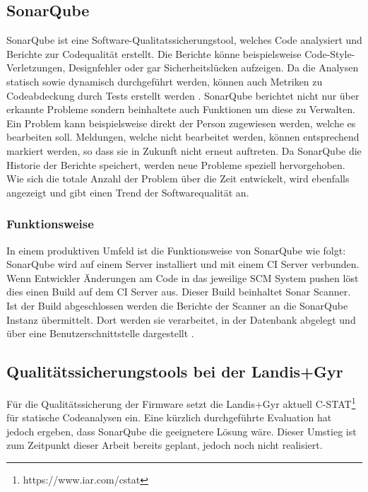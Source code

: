 \subsection{SonarQube}\label{quality:sonar}
SonarQube ist eine Software-Qualitatssicherungstool, welches Code analysiert und Berichte zur Codequalität erstellt.
Die Berichte könne beispielsweise Code-Style-Verletzungen, Designfehler oder gar Sicherheitslücken aufzeigen.
Da die Analysen statisch sowie dynamisch durchgeführt werden, können auch Metriken zu Codeabdeckung durch Tests erstellt werden \parencite{malloy_2021}.
SonarQube berichtet nicht nur über erkannte Probleme sondern beinhaltete auch Funktionen um diese zu Verwalten.
Ein Problem kann beispielsweise direkt der Person zugewiesen werden, welche es bearbeiten soll.
Meldungen, welche nicht bearbeitet werden, können entsprechend markiert werden, so dass sie in Zukunft nicht erneut auftreten.
Da SonarQube die Historie der Berichte speichert, werden neue Probleme speziell hervorgehoben.
Wie sich die totale Anzahl der Problem über die Zeit entwickelt, wird ebenfalls angezeigt und gibt einen Trend der Softwarequalität an.


\subsubsection{Funktionsweise}\label{sonar:funktionsweise}
In einem produktiven Umfeld ist die Funktionsweise von SonarQube wie folgt:
SonarQube wird auf einem Server installiert und mit einem \ac{CI} Server verbunden.
Wenn Entwickler Änderungen am Code in das jeweilige \ac{SCM} System pushen löst dies einen Build auf dem \ac{CI} Server aus.
Dieser Build beinhaltet Sonar Scanner.
Ist der Build abgeschlossen werden die Berichte der Scanner an die SonarQube Instanz übermittelt.
Dort werden sie verarbeitet, in der Datenbank abgelegt und über eine Benutzerschnittstelle dargestellt \parencite{malloy_2021}.

\subsection{Qualitätssicherungstools bei der Landis+Gyr}
Für die Qualitätssicherung der Firmware setzt die Landis+Gyr aktuell C-STAT\footnote{https://www.iar.com/cstat} für statische Codeanalysen ein.
Eine kürzlich durchgeführte Evaluation hat jedoch ergeben, dass SonarQube die geeignetere Lösung wäre.
Dieser Umstieg ist zum Zeitpunkt dieser Arbeit bereits geplant, jedoch noch nicht realisiert.
